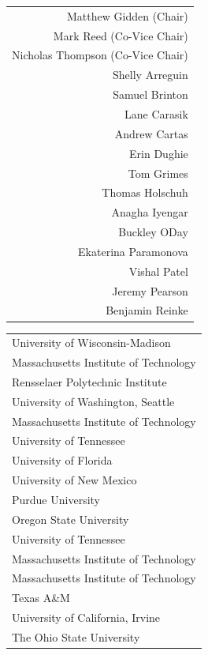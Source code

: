 \begin{large}
\begin{minipage}[b]{0.45\linewidth}
\centering
\begin{tabular}{r}
Matthew Gidden (Chair)\\
Mark Reed (Co-Vice Chair)\\
Nicholas Thompson (Co-Vice Chair)\\ 
Shelly Arreguin\\
Samuel Brinton\\
Lane Carasik\\
Andrew Cartas \\
Erin Dughie\\
Tom Grimes\\
Thomas Holschuh\\
Anagha Iyengar\\
Buckley ODay\\
Ekaterina Paramonova\\
Vishal Patel\\
Jeremy Pearson\\
Benjamin Reinke\\
\end{tabular}
\end{minipage}
\hspace{1cm}
\begin{minipage}[b]{0.45\linewidth}
\centering
\begin{tabular}{l}
University of Wisconsin-Madison\\
Massachusetts Institute of Technology\\
Rensselaer Polytechnic Institute\\
University of Washington, Seattle\\
Massachusetts Institute of Technology\\
University of Tennessee\\
University of Florida\\
University of New Mexico\\
Purdue University\\
Oregon State University\\
University of Tennessee\\
Massachusetts Institute of Technology\\
Massachusetts Institute of Technology\\
Texas A\&M\\
University of California, Irvine\\
The Ohio State University\\
\end{tabular}
\end{minipage}
\end{large}
\thispagestyle{empty}

